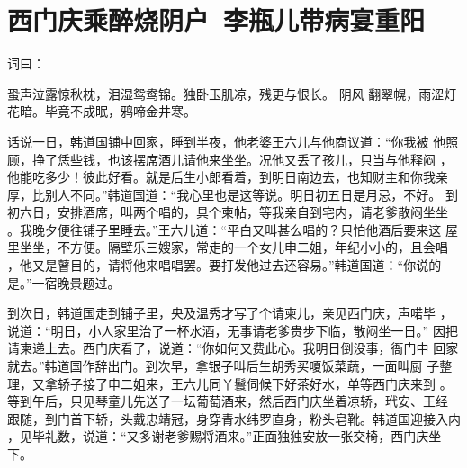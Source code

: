 \chapter{西门庆乘醉烧阴户~李瓶儿带病宴重阳}

词曰：

蛩声泣露惊秋枕，泪湿鸳鸯锦。独卧玉肌凉，残更与恨长。  阴风
翻翠幌，雨涩灯花暗。毕竟不成眠，鸦啼金井寒。

话说一日，韩道国铺中回家，睡到半夜，他老婆王六儿与他商议道：“你我被
他照顾，挣了恁些钱，也该摆席酒儿请他来坐坐。况他又丢了孩儿，只当与他释闷
，他能吃多少！彼此好看。就是后生小郎看着，到明日南边去，也知财主和你我亲
厚，比别人不同。”韩道国道：“我心里也是这等说。明日初五日是月忌，不好。
到初六日，安排酒席，叫两个唱的，具个柬帖，等我亲自到宅内，请老爹散闷坐坐
。我晚夕便往铺子里睡去。”王六儿道：“平白又叫甚么唱的？只怕他酒后要来这
屋里坐坐，不方便。隔壁乐三嫂家，常走的一个女儿申二姐，年纪小小的，且会唱
，他又是瞽目的，请将他来唱唱罢。要打发他过去还容易。”韩道国道：“你说的
是。”一宿晚景题过。

到次日，韩道国走到铺子里，央及温秀才写了个请柬儿，亲见西门庆，声喏毕
，说道：“明日，小人家里治了一杯水酒，无事请老爹贵步下临，散闷坐一日。”
因把请柬递上去。西门庆看了，说道：“你如何又费此心。我明日倒没事，衙门中
回家就去。”韩道国作辞出门。到次早，拿银子叫后生胡秀买嗄饭菜蔬，一面叫厨
子整理，又拿轿子接了申二姐来，王六儿同丫鬟伺候下好茶好水，单等西门庆来到
。等到午后，只见琴童儿先送了一坛葡萄酒来，然后西门庆坐着凉轿，玳安、王经
跟随，到门首下轿，头戴忠靖冠，身穿青水纬罗直身，粉头皂靴。韩道国迎接入内
，见毕礼数，说道：“又多谢老爹赐将酒来。”正面独独安放一张交椅，西门庆坐
下。


